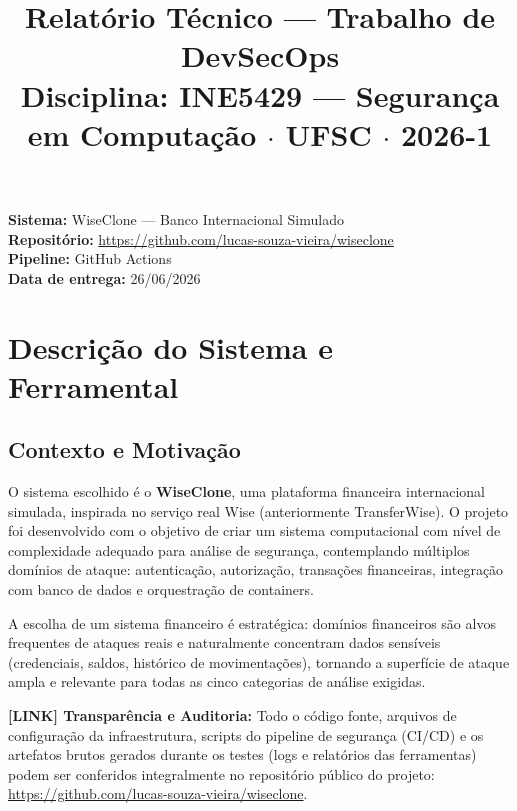 \documentclass[12pt,a4paper]{article}
\title{\textbf{Relatório Técnico — Trabalho de DevSecOps} \\ \large Disciplina: INE5429 — Segurança em Computação $\cdot$ UFSC $\cdot$ 2026-1}
\author{}
\date{}
\begin{document}
\maketitle
\vspace{-1.5cm}

\begin{mdframed}
\textbf{Sistema:} WiseClone — Banco Internacional Simulado \\
\textbf{Repositório:} \href{https://github.com/lucas-souza-vieira/wiseclone}{https://github.com/lucas-souza-vieira/wiseclone} \\
\textbf{Pipeline:} GitHub Actions \\
\textbf{Data de entrega:} 26/06/2026
\end{mdframed}

\section{Descrição do Sistema e Ferramental}

\subsection{Contexto e Motivação}
O sistema escolhido é o \textbf{WiseClone}, uma plataforma financeira internacional simulada, inspirada no serviço real Wise (anteriormente TransferWise). O projeto foi desenvolvido com o objetivo de criar um sistema computacional com nível de complexidade adequado para análise de segurança, contemplando múltiplos domínios de ataque: autenticação, autorização, transações financeiras, integração com banco de dados e orquestração de containers.

A escolha de um sistema financeiro é estratégica: domínios financeiros são alvos frequentes de ataques reais e naturalmente concentram dados sensíveis (credenciais, saldos, histórico de movimentações), tornando a superfície de ataque ampla e relevante para todas as cinco categorias de análise exigidas.

\begin{mdframed}[backgroundcolor=yellow!10]
\textbf{[LINK] Transparência e Auditoria:} Todo o código fonte, arquivos de configuração da infraestrutura, scripts do pipeline de segurança (CI/CD) e os artefatos brutos gerados durante os testes (logs e relatórios das ferramentas) podem ser conferidos integralmente no repositório público do projeto: \href{https://github.com/lucas-souza-vieira/wiseclone}{https://github.com/lucas-souza-vieira/wiseclone}.
\end{mdframed}
\end{document}

